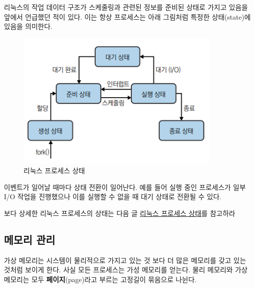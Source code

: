 \begin{flushleft}
    리눅스의 작업 데이터 구조가 스케줄링과 관련된 정보를 준비된 상태로 가지고 있음을 
    앞에서 언급했던 적이 있다.
    이는 항상 프로세스는 아래 그림처럼 
    특정한 상태(state)에 있음을 의미한다.
\end{flushleft}
\newpage

\begin{figure}[h]
    \centering
    \includegraphics[width=10cm]{resource/2-2.png}
    \caption{리눅스 프로세스 상태}
\end{figure}

\begin{flushleft}
    이벤트가 일어날 때마다 상태 전환이 일어난다.
    예를 들어 실행 중인 프로세스가 일부 I/O 작업을 진행했으나 
    이를 실행할 수 없을 때 대기 상태로 전환될 수 있다.
\end{flushleft}

\begin{flushleft}
    보다 상세한 리눅스 프로세스의 상태는 
    다음 글 \href{https://www.baeldung.com/linux/process-states}{리눅스 프로세스 상태}를 참고하라
\end{flushleft}


\subsection{메모리 관리}
\begin{flushleft}
    가상 메모리는 시스템이 물리적으로  가지고 있는 것 보다
    더 많은 메모리를 갖고 있는 것처럼 보이게 한다.
    사실 모든 프로세스는 가성 메모리를 얻는다.
    물리 메모리와 가상 메모리는 모두 \textbf{페이지}(page)라고 부르는 고정길이 묶음으로 나뉜다.
\end{flushleft}

